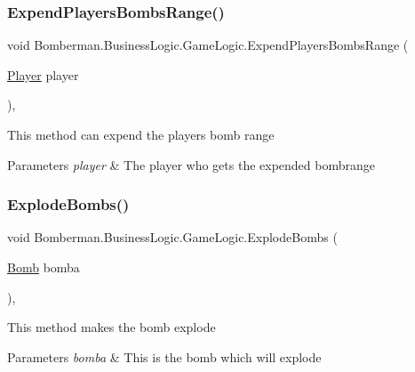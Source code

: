 \subsubsection{\texorpdfstring{ExpendPlayersBombsRange()}{ExpendPlayersBombsRange()}}
{\footnotesize\ttfamily void Bomberman.\+Business\+Logic.\+Game\+Logic.\+Expend\+Players\+Bombs\+Range (\begin{DoxyParamCaption}\item[{\mbox{\hyperlink{class_bomberman_1_1_model_1_1_player}{Player}}}]{player }\end{DoxyParamCaption})\hspace{0.3cm}{\ttfamily [inline]}, {\ttfamily [private]}}



This method can expend the players bomb range 


\begin{DoxyParams}{Parameters}
{\em player} & The player who gets the expended bombrange\\
\hline
\end{DoxyParams}
\mbox{\label{class_bomberman_1_1_business_logic_1_1_game_logic_a05daa619b4b1b7f5cc0fdbe3351fde57}} 
\subsubsection{\texorpdfstring{ExplodeBombs()}{ExplodeBombs()}}
{\footnotesize\ttfamily void Bomberman.\+Business\+Logic.\+Game\+Logic.\+Explode\+Bombs (\begin{DoxyParamCaption}\item[{\mbox{\hyperlink{class_bomberman_1_1_model_1_1_bomb}{Bomb}}}]{bomba }\end{DoxyParamCaption})\hspace{0.3cm}{\ttfamily [inline]}, {\ttfamily [private]}}



This method makes the bomb explode 


\begin{DoxyParams}{Parameters}
{\em bomba} & This is the bomb which will explode\\
\hline
\end{DoxyParams}
\mbox{\label{class_bomberman_1_1_business_logic_1_1_game_logic_ae2dc494b30a42358976a4fc3ce192435}} 
